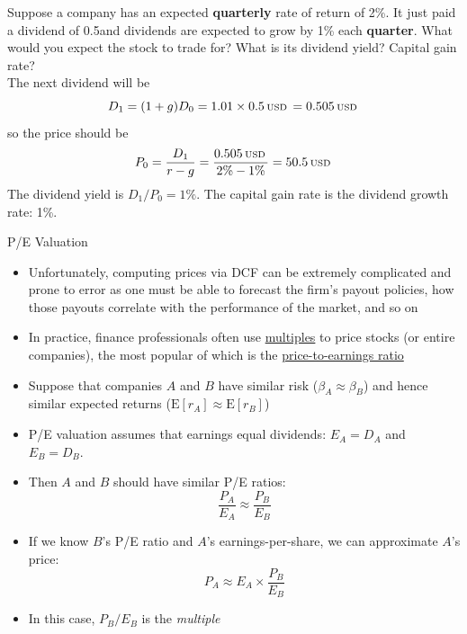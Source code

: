 \documentclass{beamer}
\newcommand{\USD}{\text{\scriptsize\:USD\:}}
\begin{document}
\begin{frame}{}
	Suppose a company has an expected \textbf{quarterly} rate of return of 2\%. It just paid a dividend of 0.5\USD and dividends are expected to grow by 1\% each \textbf{quarter}. What would you expect the stock to trade for? What is its dividend yield? Capital gain rate? \\
	\pause
	{\color{blue}The next dividend will be 
	\begin{equation*}
		D_{1}=(1+g)D_{0}=1.01\times 0.5\USD=0.505\USD
	\end{equation*}
	so the price should be
	\begin{equation}
		P_{0}=\frac{D_{1}}{r-g}=\frac{0.505\USD}{2\%-1\%}=50.5\USD
	\end{equation}
	The dividend yield is $D_{1}/P_{0}=1\%$. The capital gain rate is the dividend growth rate: 1\%.
	}
\end{frame}
\begin{frame}
\begin{center}
\Huge P/E Valuation
\end{center}
\end{frame}

\begin{frame}{}
\begin{itemize}
	\item Unfortunately, computing prices via DCF can be extremely complicated and prone to error as one must be able to forecast the firm's payout policies, how those payouts correlate with the performance of the market, and so on
	\item In practice, finance professionals often use \underline{multiples} to price stocks (or entire companies), the most popular of which is the \underline{price-to-earnings ratio}
\end{itemize}
\end{frame}

\begin{frame}{}
\begin{itemize}
	\item Suppose that companies $A$ and $B$ have similar risk ($\beta_{A}\approx\beta_{B}$) and hence similar expected returns ($\text{E}[r_{A}]\approx\text{E}[r_{B}]$)
	\item P/E valuation assumes that earnings equal dividends: $E_{A}=D_{A}$ and $E_{B}=D_{B}$. 
	\item Then $A$ and $B$ should have similar P/E ratios:
	\begin{equation*}
		\frac{P_{A}}{E_{A}}\approx\frac{P_{B}}{E_{B}}
	\end{equation*}
	\item If we know $B$'s P/E ratio and $A$'s earnings-per-share, we can approximate $A$'s price:
	\begin{equation*}
		P_{A}\approx E_{A}\times\frac{P_{B}}{E_{B}}
	\end{equation*}
	\item In this case, $P_{B}/E_{B}$ is the \textit{multiple}
\end{itemize}
\end{frame}
\end{document}

